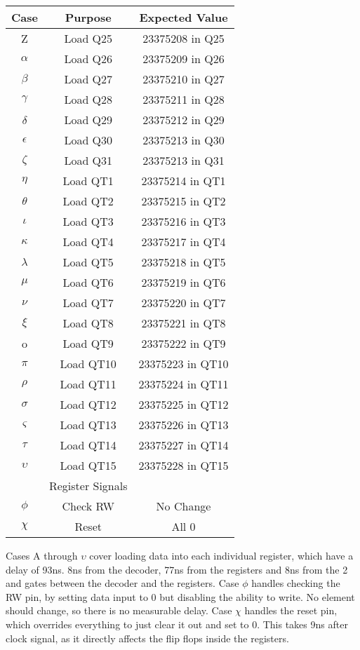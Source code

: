 \documentclass{article}
\begin{document}
\begin{tabular}{ |c|c|c| }
\hline
Case & Purpose & Expected Value \\
\hline
Z & Load Q25 & 23375208 in Q25\\
$\alpha$ & Load Q26 & 23375209 in Q26\\
$\beta$ & Load Q27 & 23375210 in Q27\\
$\gamma$ & Load Q28 & 23375211 in Q28\\
$\delta$ & Load Q29 & 23375212 in Q29\\
$\epsilon$ & Load Q30 & 23375213 in Q30\\
$\zeta$ & Load Q31 & 23375213 in Q31\\
$\eta$ & Load QT1 & 23375214 in QT1\\
$\theta$ & Load QT2 & 23375215 in QT2\\
$\iota$ & Load QT3 & 23375216 in QT3\\
$\kappa$ & Load QT4 & 23375217 in QT4\\
$\lambda$ & Load QT5 & 23375218 in QT5\\
$\mu$ & Load QT6 & 23375219 in QT6\\
$\nu$ & Load QT7 & 23375220 in QT7\\
$\xi$ & Load QT8 & 23375221 in QT8\\
o & Load QT9 & 23375222 in QT9\\
$\pi$ & Load QT10 & 23375223 in QT10\\
$\rho$ & Load QT11 & 23375224 in QT11\\
$\sigma$ & Load QT12 & 23375225 in QT12\\
$\varsigma$ & Load QT13 & 23375226 in QT13\\
$\tau$ & Load QT14 & 23375227 in QT14\\
$\upsilon$ & Load QT15 & 23375228 in QT15\\
& Register Signals & \\
$\phi$ & Check RW & No Change \\
$\chi$ & Reset & All 0 \\
\hline
\end{tabular}


\newpage

\author{Kyara McWilliam 23375183}
\hfill \break \break
Cases A through $\upsilon$ cover loading data into each individual register, which have a delay of 93ns. 8ns from the decoder, 77ns from the registers and 8ns from the 2 and gates between the decoder and the registers.
\hfill \break \break
Case $\phi$ handles checking the RW pin, by setting data input to 0 but disabling the ability to write. No element should change, so there is no measurable delay.
\hfill \break \break
Case $\chi$ handles the reset pin, which overrides everything to just clear it out and set to 0. This takes 9ns after clock signal, as it directly affects the flip flops inside the registers.
\end{document}
